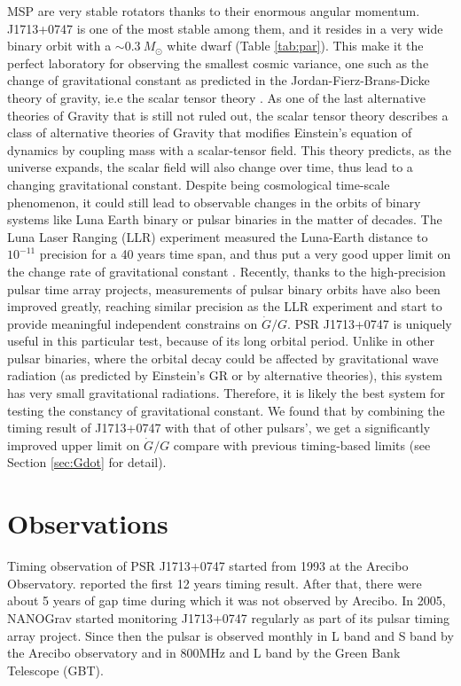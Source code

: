 MSP are very stable rotators thanks to their enormous angular momentum.
J1713+0747 is one of
the most stable among them, and it resides in a very wide binary orbit
with a $\sim0.3~M_{\odot}$ white dwarf (Table \ref{tab:par}). This make it the
perfect laboratory for observing the smallest cosmic variance, one such as the
change of gravitational constant as predicted in the Jordan-Fierz-Brans-Dicke
theory of gravity, ie.e the scalar tensor theory \citep{jor59,fie56,bd61}. 
As one of the last alternative theories of Gravity that is still not
ruled out, the scalar tensor theory describes a class of alternative theories of Gravity
that modifies Einstein's equation of dynamics by coupling mass with a scalar-tensor field.
This theory predicts, as the universe expands, the scalar field will
also change over time, thus lead to a changing gravitational constant. Despite
being cosmological time-scale phenomenon, it could still lead to observable 
changes in the orbits of binary systems like Luna Earth binary or pulsar
binaries in the matter of decades. The Luna Laser Ranging (LLR) experiment measured the
Luna-Earth distance to $10^{-11}$ precision for a 40 years time span, and thus put a
very good upper limit on the change rate of gravitational constant
\citep{hmb10}. Recently, thanks to the high-precision pulsar time array
projects, measurements of pulsar binary orbits have also been improved
greatly, reaching similar precision as the LLR experiment and start to provide
meaningful independent constrains on $\dot{G}/G$. PSR J1713+0747 is uniquely
useful in this particular test, because of its long orbital period. Unlike in
other pulsar binaries, where the orbital decay could be affected by
gravitational wave radiation (as predicted by Einstein's GR or by 
alternative theories), this system has very small gravitational radiations. 
Therefore, it is likely the best system for testing the constancy of
gravitational constant. We found that by combining the timing result of
J1713+0747 with that of other pulsars', we get a significantly improved upper limit
on $\dot{G}/G$ compare with previous timing-based limits (see Section
\ref{sec:Gdot} for detail).


\section{Observations}
Timing observation of PSR J1713+0747 started from 1993 at the Arecibo
Observatory. \citet{sns+05} reported the first 12 years timing result. After
that, there were about 5 years of gap time during which it was not observed by
Arecibo.  In 2005, NANOGrav started monitoring  J1713+0747 regularly as part
of  its pulsar timing array project. Since then the pulsar is observed monthly
in L band and S band by the Arecibo
observatory and in 800MHz and L band by the Green Bank Telescope (GBT).

